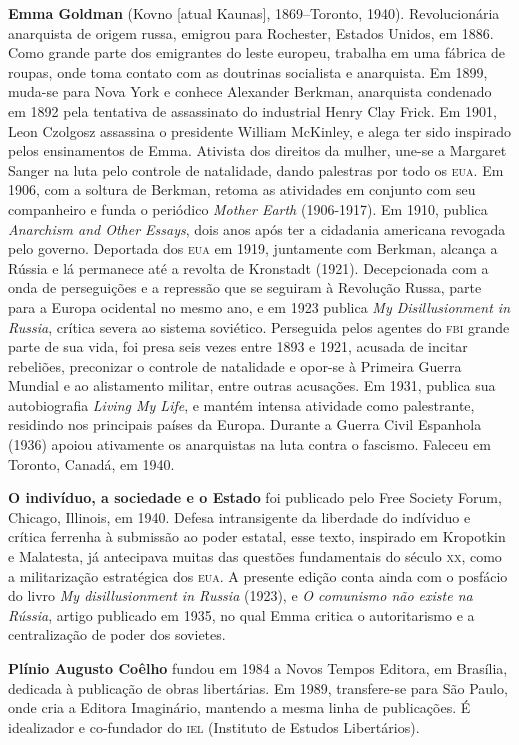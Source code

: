 \textbf{Emma Goldman} (Kovno [atual Kaunas], 1869--Toronto,
1940). Revolucionária anarquista de origem russa, emigrou para Rochester,
Estados Unidos, em 1886.  Como grande parte dos emigrantes do leste europeu,
trabalha em uma fábrica de roupas, onde toma contato com as doutrinas socialista
e anarquista. Em 1899, muda-se para Nova York e conhece Alexander Berkman,
anarquista condenado em 1892 pela tentativa de assassinato do industrial Henry
Clay Frick. Em 1901, Leon Czolgosz assassina o presidente William McKinley, e
alega ter sido inspirado pelos ensinamentos de Emma. Ativista dos direitos da
mulher, une-se a Margaret Sanger na luta pelo controle de natalidade, dando
palestras por todo os \textsc{eua}. Em 1906, com a soltura de Berkman, retoma as
atividades em conjunto com seu companheiro e funda o periódico \textit{Mother
Earth} (1906-1917). Em 1910, publica  \textit{Anarchism and Other Essays}, dois
anos após ter a cidadania americana revogada pelo governo.  Deportada dos
\textsc{eua} em 1919, juntamente com Berkman, alcança a Rússia e lá permanece
até a revolta de Kronstadt (1921). Decepcionada com a onda de perseguições e a
repressão que se seguiram à Revolução Russa, parte para a Europa ocidental no
mesmo ano, e em 1923 publica \textit{My Disillusionment in Russia}, crítica
severa ao sistema soviético. Perseguida pelos agentes do \textsc{fbi} grande
parte de sua vida, foi presa seis vezes entre 1893 e 1921, acusada de incitar
rebeliões, preconizar o controle de natalidade e opor-se à Primeira Guerra
Mundial e ao alistamento militar, entre outras acusações. Em 1931, publica sua
autobiografia \textit{Living My Life}, e mantém intensa atividade como
palestrante, residindo nos principais países da Europa. Durante a Guerra Civil
Espanhola (1936) apoiou ativamente os anarquistas na luta contra o fascismo.
Faleceu em Toronto, Canadá, em 1940.  

\textbf{O indivíduo, a sociedade e o Estado} foi publicado pelo Free Society
Forum, Chicago, Illinois, em 1940. Defesa intransigente da liberdade do
indíviduo e crítica ferrenha à submissão ao poder estatal, esse texto, inspirado
em Kropotkin e Malatesta, já antecipava muitas das questões fundamentais do
século \textsc{xx}, como a militarização estratégica dos \textsc{eua}. A
presente edição conta ainda com o posfácio do livro \textit{My disillusionment
in Russia} (1923), e \textit{O comunismo não existe na Rússia}, artigo publicado
em 1935, no qual Emma critica o autoritarismo e a centralização de poder dos
sovietes.  

\textbf{Plínio Augusto Coêlho}  fundou em 1984 a Novos Tempos Editora, em
Brasília, dedicada à publicação de obras libertárias. Em 1989, transfere-se para
São Paulo, onde cria a Editora Imaginário, mantendo a mesma linha de
publicações. É idealizador e co-fundador do \textsc{iel} (Instituto de Estudos
Libertários).  

